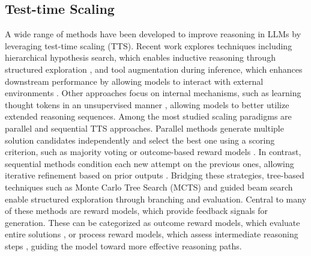 \subsection{Test-time Scaling}
A wide range of methods have been developed to improve reasoning in LLMs by leveraging test-time scaling (TTS). Recent work explores techniques including hierarchical hypothesis search, which enables inductive reasoning through structured exploration \citep{wang2023hypothesis}, and tool augmentation during inference, which enhances downstream performance by allowing models to interact with external environments \citep{gao2023pal, qintoolllm,guo2025reagan}. Other approaches focus on internal mechanisms, such as learning thought tokens in an unsupervised manner \citep{zelikman2024quiet, goyal2023think}, allowing models to better utilize extended reasoning sequences. Among the most studied scaling paradigms are parallel and sequential TTS approaches. Parallel methods generate multiple solution candidates independently and select the best one using a scoring criterion, such as majority voting or outcome-based reward models \citep{brown2024large, irvine2023rewarding, snell2025scaling}. In contrast, sequential methods condition each new attempt on the previous ones, allowing iterative refinement based on prior outputs \citep{s1,snell2025scaling, hou2025advancing, lee2025evolving, cai2024role, shi2024scaling, he2025self,zhang2025growing}. Bridging these strategies, tree-based techniques such as Monte Carlo Tree Search (MCTS) \citep{zhang2023planning, zhou2023language, zhang2024llama, wu2024inference} and guided beam search \citep{xie2023self} enable structured exploration through branching and evaluation. Central to many of these methods are reward models, which provide feedback signals for generation. These can be categorized as outcome reward models, which evaluate entire solutions \citep{xin2024deepseek, ankner2024critique}, or process reward models, which assess intermediate reasoning steps \citep{lightman2023let, wang2023math, wu2024inference}, guiding the model toward more effective reasoning paths.